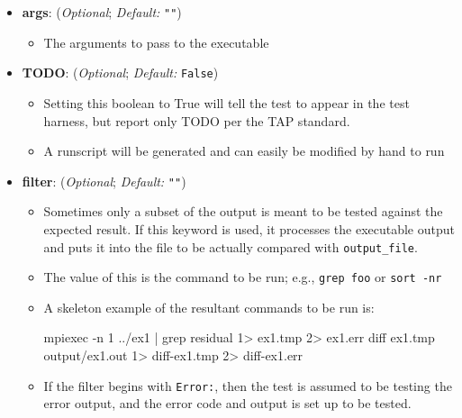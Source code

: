 \begin{itemize}
\begin{itemize}
      \end{itemize}


    \item[]  \textbf{args}: (\emph{Optional}; \emph{Default:} \lstinline{""})

      \begin{itemize}

      \item The arguments to pass to the executable

      \end{itemize}

    \item[]  \textbf{TODO}: (\emph{Optional}; \emph{Default:} \lstinline{False})
      \begin{itemize}

      \item Setting this boolean to True will tell the test to appear in the test harness, but
      report only TODO per the TAP standard.

      \item A runscript will be generated and can easily be modified by hand to run

      \end{itemize}

    \item[]  \textbf{filter}: (\emph{Optional}; \emph{Default:} \lstinline{""})

      \begin{itemize}

      \item Sometimes only a subset of the output is meant to be tested
      against the expected result.  If this keyword is used, it
      processes the executable output and puts it into the file
      to be actually compared with \lstinline{output_file}.

      \item The value of this is the command to be run; e.g., \lstinline{grep foo} or
      \lstinline{sort -nr}

      \item A skeleton example of the resultant commands to be run is:
      \begin{bashlisting}
mpiexec -n 1 ../ex1 | grep residual 1> ex1.tmp 2> ex1.err
diff ex1.tmp output/ex1.out 1> diff-ex1.tmp 2> diff-ex1.err
      \end{bashlisting}

      \item If the filter begins with \lstinline{Error:}, then the test is
            assumed to be testing the error output, and the error code and
            output is set up to be tested.


\end{itemize}
\end{itemize}

